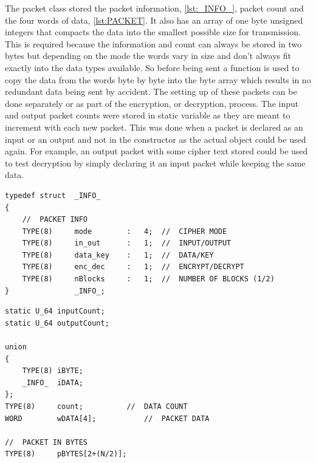 \documentclass[12pt,twoside,a4paper]{report}
\begin{document}
   	The packet class stored the packet information, \autoref{lst:_INFO_}, packet count and the four words of data, \autoref{lst:PACKET}. It also has an array of one byte unsigned integers that compacts the data into the smallest possible size for transmission. This is required because the information and count can always be stored in two bytes but depending on the mode the words vary in size and don't always fit exactly into the data types available. So before being sent a function is used to copy the data from the words byte by byte into the byte array which results in no redundant data being sent by accident. The setting up of these packets can be done separately or as part of the encryption, or decryption, process. The input and output packet counts were stored in static variable as they are meant to increment with each new packet. This was done when a packet is declared as an input or an output and not in the constructor as the actual object could be used again. For example, an output packet with some cipher text stored could be used to test decryption by simply declaring it an input packet while keeping the same data.

	\begin{minipage}{\linewidth}
	\begin{lstlisting}[label={lst:_INFO_},caption={Declaration of Packet information},style=CStyle]
typedef struct	_INFO_
{
	//	PACKET INFO
	TYPE(8)		mode		:	4;	//	CIPHER MODE
	TYPE(8)		in_out		:	1;	//	INPUT/OUTPUT
	TYPE(8)		data_key	:	1;	//	DATA/KEY
	TYPE(8)		enc_dec		:	1;	//	ENCRYPT/DECRYPT
	TYPE(8)		nBlocks		:	1;	//	NUMBER OF BLOCKS (1/2)
}				_INFO_;\end{lstlisting}
	\end{minipage}

	\begin{minipage}{\linewidth}
	\begin{lstlisting}[label={lst:PACKET},caption={Data stored in Packet class},style=CStyle]	
static U_64	inputCount;
static U_64	outputCount;

union
{
	TYPE(8)	iBYTE;
	_INFO_	iDATA;
};
TYPE(8)		count;			//	DATA COUNT
WORD		wDATA[4];			//	PACKET DATA

//	PACKET IN BYTES	
TYPE(8)		pBYTES[2+(N/2)];\end{lstlisting}
	\end{minipage}
   	
\end{document}
